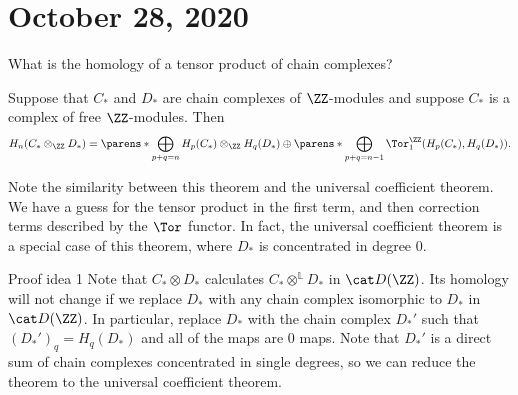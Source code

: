 \documentclass{standalone}
\begin{document}
\chapter{October 28, 2020}

\begin{question}
  What is the homology of a tensor product of chain complexes?
\end{question}

\begin{theorem}[K\"unneth]
  Suppose that \(C_*\) and \(D_*\) are chain complexes of \(\ZZ\)-modules
  and suppose \(C_*\) is a complex of free \(\ZZ\)-modules. Then
  \[
    H_n(C_* \otimes_\ZZ D_*)
      = \parens*{\bigoplus_{p + q = n} H_p(C_*) \otimes_\ZZ H_q(D_*)} \oplus
        \parens*{\bigoplus_{p + q = n-1} \Tor_1^{\ZZ}(H_p(C_*), H_q(D_*))}.
  \]
\end{theorem}

Note the similarity between this theorem and the universal coefficient theorem.
We have a guess for the tensor product in the first term,
and then correction terms described by the \(\Tor\) functor.
In fact, the universal coefficient theorem is a special case of this theorem,
where \(D_*\) is concentrated in degree \(0\).

\begin{proof*}{Proof idea 1}
  Note that \(C_* \otimes D_*\) calculates
  \(C_* \otimes^{\mathbb L} D_*\) in \(\der(\ZZ)\).
  Its homology will not change if we replace \(D_*\) with
  any chain complex isomorphic to \(D_*\) in \(\der(\ZZ)\).
  In particular, replace \(D_*\) with the chain complex \(D_*'\)
  such that \((D_*')_q = H_q(D_*)\) and all of the maps are \(0\) maps.
  Note that \(D_*'\) is a direct sum of
  chain complexes concentrated in single degrees,
  so we can reduce the theorem to the universal coefficient theorem.
\end{proof*}
\end{document}
